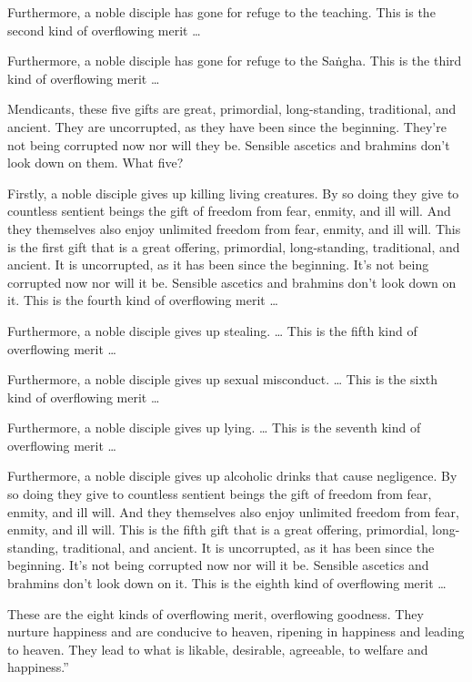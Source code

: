 \documentclass[12pt,openany]{book}%
\begin{document}
Furthermore, a noble disciple has gone for refuge to the teaching. This is the second kind of overflowing merit … 

Furthermore, a noble disciple has gone for refuge to the \textsanskrit{Saṅgha}. This is the third kind of overflowing merit … 

Mendicants, these five gifts are great, primordial, long-standing, traditional, and ancient. They are uncorrupted, as they have been since the beginning. They’re not being corrupted now nor will they be. Sensible ascetics and brahmins don’t look down on them. What five? 

Firstly, a noble disciple gives up killing living creatures. By so doing they give to countless sentient beings the gift of freedom from fear, enmity, and ill will. And they themselves also enjoy unlimited freedom from fear, enmity, and ill will. This is the first gift that is a great offering, primordial, long-standing, traditional, and ancient. It is uncorrupted, as it has been since the beginning. It’s not being corrupted now nor will it be. Sensible ascetics and brahmins don’t look down on it. This is the fourth kind of overflowing merit … 

Furthermore, a noble disciple gives up stealing. … This is the fifth kind of overflowing merit … 

Furthermore, a noble disciple gives up sexual misconduct. … This is the sixth kind of overflowing merit … 

Furthermore, a noble disciple gives up lying. … This is the seventh kind of overflowing merit … 

Furthermore, a noble disciple gives up alcoholic drinks that cause negligence. By so doing they give to countless sentient beings the gift of freedom from fear, enmity, and ill will. And they themselves also enjoy unlimited freedom from fear, enmity, and ill will. This is the fifth gift that is a great offering, primordial, long-standing, traditional, and ancient. It is uncorrupted, as it has been since the beginning. It’s not being corrupted now nor will it be. Sensible ascetics and brahmins don’t look down on it. This is the eighth kind of overflowing merit … 

These are the eight kinds of overflowing merit, overflowing goodness. They nurture happiness and are conducive to heaven, ripening in happiness and leading to heaven. They lead to what is likable, desirable, agreeable, to welfare and happiness.” 
\end{document}
